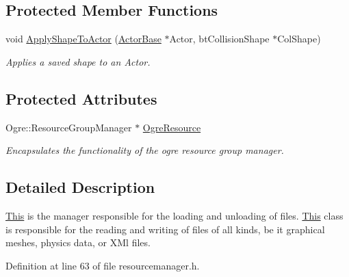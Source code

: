 \subsection*{Protected Member Functions}
\begin{DoxyCompactItemize}
\item 
\hypertarget{classphys_1_1ResourceManager_a1823d2d08fc3b6052ed893896eef6291}{
void \hyperlink{classphys_1_1ResourceManager_a1823d2d08fc3b6052ed893896eef6291}{ApplyShapeToActor} (\hyperlink{classphys_1_1ActorBase}{ActorBase} $\ast$Actor, btCollisionShape $\ast$ColShape)}
\label{d1/d35/classphys_1_1ResourceManager_a1823d2d08fc3b6052ed893896eef6291}

\begin{DoxyCompactList}\small\item\em Applies a saved shape to an Actor. \item\end{DoxyCompactList}\end{DoxyCompactItemize}
\subsection*{Protected Attributes}
\begin{DoxyCompactItemize}
\item 
\hypertarget{classphys_1_1ResourceManager_af19bf0549a0896cf84696a39f4ca817d}{
Ogre::ResourceGroupManager $\ast$ \hyperlink{classphys_1_1ResourceManager_af19bf0549a0896cf84696a39f4ca817d}{OgreResource}}
\label{d1/d35/classphys_1_1ResourceManager_af19bf0549a0896cf84696a39f4ca817d}

\begin{DoxyCompactList}\small\item\em Encapsulates the functionality of the ogre resource group manager. \item\end{DoxyCompactList}\end{DoxyCompactItemize}


\subsection{Detailed Description}
\hyperlink{structThis}{This} is the manager responsible for the loading and unloading of files. \hyperlink{structThis}{This} class is responsible for the reading and writing of files of all kinds, be it graphical meshes, physics data, or XMl files. 

Definition at line 63 of file resourcemanager.h.



